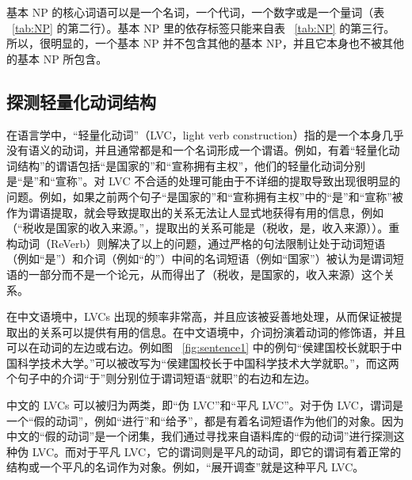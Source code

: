 基本 NP 的核心词语可以是一个名词，一个代词，一个数字或是一个量词（表 ~\ref{tab:NP} 的第二行）。基本 NP 里的依存标签只能来自表 ~\ref{tab:NP} 的第三行。所以，很明显的，一个基本 NP 并不包含其他的基本 NP，并且它本身也不被其他的基本 NP 所包含。

\subsection{探测轻量化动词结构}
在语言学中，“轻量化动词”（LVC，light verb construction）指的是一个本身几乎没有语义的动词，并且通常都是和一个名词形成一个谓语\citep{Etzioni2011}。例如，有着“轻量化动词结构”的谓语包括“是国家的”和“宣称拥有主权”，他们的轻量化动词分别是“是”和“宣称”。对 LVC 不合适的处理可能由于不详细的提取导致出现很明显的问题。例如，如果之前两个句子“是国家的”和“宣称拥有主权”中的“是”和“宣称”被作为谓语提取，就会导致提取出的关系无法让人显式地获得有用的信息\citep{Etzioni2011}，例如（“税收是国家的收入来源。”，提取出的关系可能是（税收，是，收入来源））。重构动词（ReVerb\citep{Etzioni2011}）则解决了以上的问题，通过严格的句法限制让处于动词短语（例如“是”）和介词（例如“的”）中间的名词短语（例如“国家”）被认为是谓词短语的一部分而不是一个论元，从而得出了（税收，是国家的，收入来源）这个关系。

在中文语境中，LVCs 出现的频率非常高，并且应该被妥善地处理，从而保证被提取出的关系可以提供有用的信息。在中文语境中，介词扮演着动词的修饰语，并且可以在动词的左边或右边。例如图 ~\ref{fig:sentence1} 中的例句“侯建国校长就职于中国科学技术大学。”可以被改写为“侯建国校长于中国科学技术大学就职。”，而这两个句子中的介词“于”则分别位于谓词短语“就职”的右边和左边。

中文的 LVCs 可以被归为两类，即“伪 LVC”和“平凡 LVC”。对于伪 LVC，谓词是一个“假的动词”，例如“进行”和“给予”，都是有着名词短语作为他们的对象。因为中文的“假的动词”是一个闭集，我们通过寻找来自语料库的“假的动词”进行探测这种伪 LVC。而对于平凡 LVC，它的谓词则是平凡的动词，即它的谓词有着正常的结构或一个平凡的名词作为对象。例如，“展开调查”就是这种平凡 LVC。

